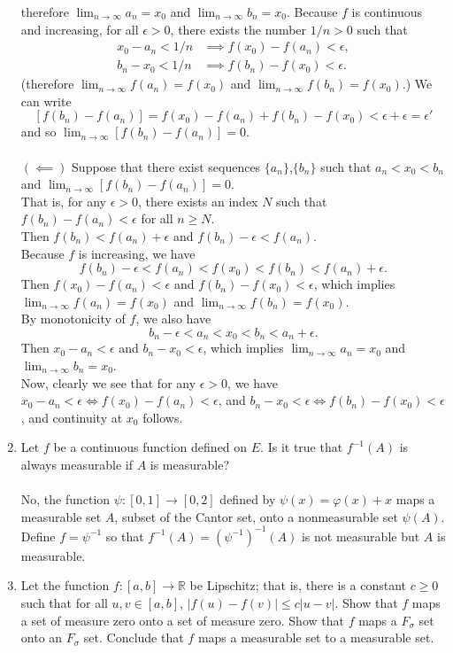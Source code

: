 \begin{enumerate}
	therefore $\lim_{n\to\infty} a_n = x_0$ and $\lim_{n\to\infty} b_n = x_0$.
	Because $f$ is continuous and increasing, for all $\epsilon>0$, there exists the number $1/n>0$ such that
	\begin{align*}
	x_0-a_n<1/n&\implies f(x_0)-f(a_n)<\epsilon,\\
	b_n-x_0<1/n&\implies f(b_n)-f(x_0)<\epsilon.
	\end{align*}
	(therefore $\lim_{n\to\infty} f(a_n) = f(x_0)$ and $\lim_{n\to\infty} f(b_n) = f(x_0)$.) We can write
	\[
		[f(b_n)-f(a_n)]=f(x_0)-f(a_n)+f(b_n)-f(x_0) <\epsilon+\epsilon=\epsilon'
	\]
	and so $\lim_{n\to\infty}[f(b_n)-f(a_n)]=0$.\\
	\\$(\impliedby)$ Suppose that there exist sequences $\{a_n\}$,$\{b_n\}$ such that $a_n<x_0<b_n$ and $\lim_{n\to\infty}[f(b_n)-f(a_n)]=0$.\\
	That is, for any $\epsilon>0$, there exists an index $N$ such that $f(b_n)-f(a_n)<\epsilon$ for all $n\ge N$.
	\\Then $f(b_n)<f(a_n)+\epsilon$ and $f(b_n)-\epsilon<f(a_n)$.\\
	Because $f$ is increasing, we have \[f(b_n)-\epsilon<f(a_n)<f(x_0)<f(b_n)<f(a_n)+\epsilon.\]
	Then $f(x_0)-f(a_n)<\epsilon$ and $f(b_n)-f(x_0)<\epsilon$, which implies $\lim_{n\to\infty} f(a_n) = f(x_0)$ and $\lim_{n\to\infty} f(b_n) = f(x_0)$.\\
	By monotonicity of $f$, we also have \[b_n-\epsilon<a_n<x_0<b_n<a_n+\epsilon.\]
	Then $x_0-a_n<\epsilon$ and $b_n-x_0<\epsilon$, which implies $\lim_{n\to\infty} a_n= x_0$ and $\lim_{n\to\infty} b_n = x_0$.\\
	Now, clearly we see that for any $\epsilon>0$, we have $x_0-a_n<\epsilon\iff f(x_0)-f(a_n)<\epsilon$, and $b_n-x_0<\epsilon\iff f(b_n)-f(x_0)<\epsilon$, and continuity at $x_0$ follows.
	\item Let $f$ be a continuous function defined on $E$. Is it true that $f^{-1}(A)$ is always measurable if $A$ is measurable?\\
	\\No, the function $\psi:[0,1]\to[0,2]$ defined by $\psi(x)=\varphi(x)+x$ maps a measurable set $A$, subset of the Cantor set, onto a nonmeasurable set $\psi(A)$. Define $f=\psi^{-1}$ so that $f^{-1}(A)=(\psi^{-1})^{-1}(A)$ is not measurable but $A$ is measurable.
	\item Let the function $f:[a,b]\to\mathbb{R}$ be Lipschitz; that is, there is a constant $c\ge0$ such that for all $u,v\in[a,b]$, $|f(u)-f(v)|\le c|u-v|$.
	Show that $f$ maps a set of measure zero onto a set of measure zero. Show that $f$ maps a $F_\sigma$ set onto an $F_\sigma$ set. Conclude that $f$ maps a measurable set to a measurable set.\\
	

\end{enumerate}
